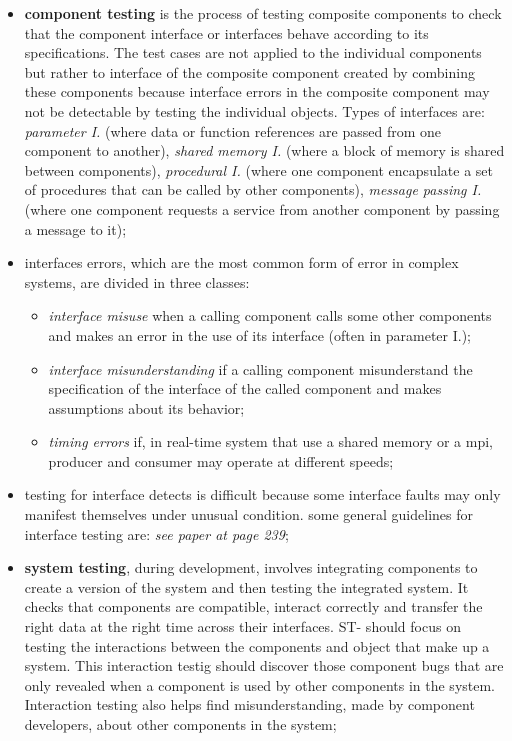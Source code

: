 \documentclass[oneside]{article}
\begin{document}
\begin{itemize}
\begin{itemize}
        \item \textbf{component testing} is the process of testing composite components to check that the component interface or interfaces behave according to its specifications. The test cases are not applied to the individual components but rather to interface of the composite component created by combining these components because interface errors in the composite component may not be detectable by testing the individual objects. Types of interfaces are: \textit{parameter I.} (where data or function references are passed from one component to another), \textit{shared memory I.} (where a block of memory is shared between components), \textit{procedural I.} (where one component encapsulate a set of procedures that can be called by other components), \textit{message passing I.} (where one component requests a service from another component by passing a message to it);
        
        \item interfaces errors, which are the most common form of error in complex systems, are divided in three classes:
            \begin{itemize}
                \item \textit{interface misuse} when a calling component calls some other components and makes an error in the use of its interface (often in parameter I.);
                \item \textit{interface misunderstanding} if a calling component misunderstand the specification of the interface of the called component and makes assumptions about its behavior;
                \item \textit{timing errors} if, in real-time system that use a shared memory or a mpi, producer and consumer may operate at different speeds;
            \end{itemize}

        \item testing for interface detects is difficult because some interface faults may only manifest themselves under unusual condition. some general guidelines for interface testing are: \textit{see paper at page 239};
        
        
        \item \textbf{system testing}, during development, involves integrating components to create a version of the system and then testing the integrated system. It checks that components are compatible, interact correctly and transfer the right data at the right time across their interfaces. ST- should focus on testing the interactions between the components and object that make up a system. This interaction testig should discover those component bugs that are only revealed when a component is used by other components in the system. Interaction testing also helps find misunderstanding, made by component developers, about other components in the system;
        

\end{itemize}
\end{itemize}
\end{document}
